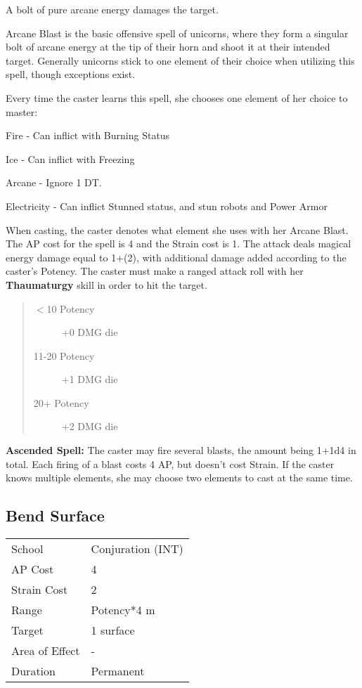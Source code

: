 \documentclass[11pt,a4paper,twocolumn]{book}
\begin{document}
\medskip

A bolt of pure arcane energy damages the target.

Arcane Blast is the basic offensive spell of unicorns, where they form a singular bolt of arcane energy at the tip of their horn and shoot it at their intended target. Generally unicorns stick to one element of their choice when utilizing this spell, though exceptions exist.

Every time the caster learns this spell, she chooses one element of her choice to master:

\medskip
\begin{compactitem}
	\item Fire - Can inflict with Burning Status
	\item Ice - Can inflict with Freezing
	\item Arcane - Ignore 1 DT.
	\item Electricity - Can inflict Stunned status, and stun robots and Power Armor
\end{compactitem}
\medskip

When casting, the caster denotes what element she uses with her Arcane Blast. The AP cost for the spell is 4 and the Strain cost is 1. The attack deals magical energy damage equal to 1+(2), with additional damage added according to the caster's Potency. The caster must make a ranged attack roll with her \textbf{Thaumaturgy} skill in order to hit the target. 

\begin{quote}
	\begin{description}
		\item[$<$10 Potency] 	+0 DMG die
		\item[11-20 Potency] 	+1 DMG die
		\item[20+ Potency] 	    +2 DMG die
	\end{description}	
\end{quote}

\textbf{Ascended Spell:} The caster may fire several blasts, the amount being 1+1d4 in total. Each firing of a blast costs 4 AP, but doesn't cost Strain. If the caster knows multiple elements, she may choose two elements to cast at the same time. 


\subsection*{Bend Surface}
{
	\begin{tabu} to 75mm{| X[l,4] | X[l,7] |}
		\hline
		School 			& Conjuration (INT) 	\\
		AP Cost	      	& 4 					\\
		Strain Cost     & 2 					\\
		Range     		& Potency*4	m			\\
		Target      	& 1 surface 			\\
		Area of Effect  & - 	 				\\
		Duration     	& Permanent				\\ \hline
	\end{tabu}
	
}
\end{document}
